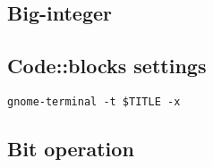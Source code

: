 \subsection{Big-integer}


%

\subsection{Code::blocks settings}
	\begin{lstlisting}
gnome-terminal -t $TITLE -x
	\end{lstlisting}
	
\subsection{Bit operation}
